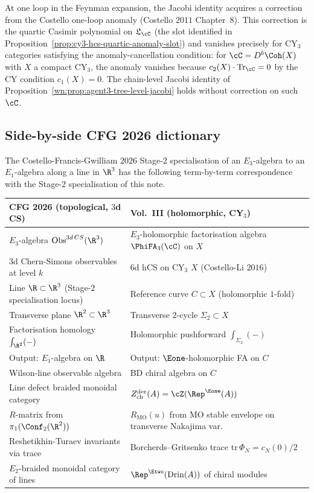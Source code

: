 \begin{remark}
\label{wn:rem:agent3-one-loop-jacobi}
At one loop in the Feynman expansion, the Jacobi identity acquires a correction from the Costello one-loop anomaly (Costello $2011$ Chapter~$8$). This correction is the quartic Casimir polynomial on $\mathfrak{L}_\cC$ (the slot identified in Proposition~\ref{prop:cy3-hcs-quartic-anomaly-slot}) and vanishes precisely for CY$_3$ categories satisfying the anomaly-cancellation condition: for $\cC=D^b\Coh(X)$ with $X$ a compact CY$_3$, the anomaly vanishes because $c_2(X)\cdot\mathrm{Tr}_\cC=0$ by the CY condition $c_1(X)=0$. The chain-level Jacobi identity of Proposition~\ref{wn:prop:agent3-tree-level-jacobi} holds without correction on such $\cC$.
\end{remark}

\subsection{Side-by-side CFG 2026 dictionary}
\label{wn:subsec:agent3-cfg-dictionary}

The Costello-Francis-Gwilliam $2026$ Stage-$2$ specialisation of an $E_3$-algebra to an $E_1$-algebra along a line in $\R^3$ has the following term-by-term correspondence with the Stage-$2$ specialisation of this note.

\begin{center}
\renewcommand{\arraystretch}{1.4}
\begin{tabular}{l|l}
\toprule
\textbf{CFG 2026 (topological, $3$d CS)} &
\textbf{Vol.~III (holomorphic, CY$_3$)} \\ \midrule
$E_3$-algebra $\mathrm{Obs}^{3d\,CS}(\R^3)$ &
$E_3$-holomorphic factorisation algebra $\PhiFA_3(\cC)$ on $X$ \\
$3$d Chern-Simons observables at level $k$ &
$6$d hCS on CY$_3$ $X$ (Costello-Li $2016$) \\
Line $\R\subset\R^3$ (Stage-$2$ specialisation locus) &
Reference curve $C\subset X$ (holomorphic $1$-fold) \\
Transverse plane $\R^2\subset\R^3$ &
Transverse $2$-cycle $\Sigma_2\subset X$ \\
Factorisation homology $\int_{\R^2}(-)$ &
Holomorphic pushforward $\int_{\Sigma_2}(-)$ \\
Output: $E_1$-algebra on $\R$ &
Output: $\Eone$-holomorphic FA on $C$ \\
Wilson-line observable algebra & BD chiral algebra on $C$ \\
Line defect braided monoidal category &
$Z^{\mathrm{der}}_{\mathrm{ch}}(A)=\cZ(\Rep^{\Eone}(A))$ \\
$R$-matrix from $\pi_1(\Conf_2(\R^2))$ &
$R_{\mathrm{MO}}(u)$ from MO stable envelope on transverse Nakajima var. \\
Reshetikhin-Turaev invariants via trace &
Borcherds--Gritsenko trace $\mathrm{tr}\,\Phi_N=c_N(0)/2$ \\
$E_2$-braided monoidal category of lines &
$\Rep^{\Etwo}(\mathrm{Drin}(A))$ of chiral modules \\
\bottomrule
\end{tabular}
\end{center}

